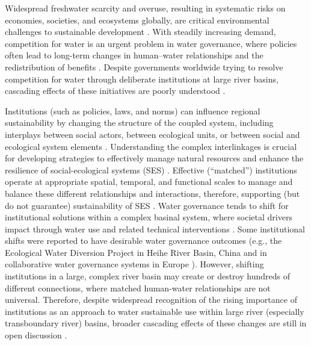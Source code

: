 Widespread freshwater scarcity and overuse, resulting in systematic risks on economies, societies, and ecosystems globally, are critical environmental challenges to sustainable development \cite{distefano2017, dolan2021, xu2020b, mekonnen2016}.
With steadily increasing demand, competition for water is an urgent problem in water governance, where policies often lead to long-term changes in human–water relationships and the redistribution of benefits \cite{gleick2010, ziolkowska2016, wang2019d}.
Despite governments worldwide trying to resolve competition for water through deliberate institutions at large river basins, cascading effects of these initiatives are poorly understood \cite{giuliani2013, falkenmark2019, jaeger2019}.

Institutions (such as policies, laws, and norms) can influence regional sustainability by changing the structure of the coupled system, including interplays between social actors, between ecological units, or between social and ecological system elements \cite{young2008,cumming2020b,lien2020, bodin2017b}.
Understanding the complex interlinkages is crucial for developing strategies to effectively manage natural resources and enhance the resilience of social-ecological systems (SES) \cite{kluger2020}.
Effective (“matched”) institutions operate at appropriate spatial, temporal, and functional scales to manage and balance these different relationships and interactions, therefore, supporting (but do not guarantee) sustainability of SES \cite{epstein2015, wang2019d}.
Water governance tends to shift for institutional solutions within a complex basinal system, where societal drivers impact through water use and related technical interventions \cite{fischer2020}.
Some institutional shifts were reported to have desirable water governance outcomes (e.g., the Ecological Water Diversion Project in Heihe River Basin, China \cite{wang2019d} and in collaborative water governance systems in Europe \cite{green2013}).
However, shifting institutions in a large, complex river basin may create or destroy hundreds of different connections, where matched human-water relationships are not universal.
Therefore, despite widespread recognition of the rising importance of institutions as an approach to water sustainable use within large river (especially transboundary river) basins, broader cascading effects of these changes are still in open discussion \cite{agrawal2003, persha2011, agrawal2001}.

